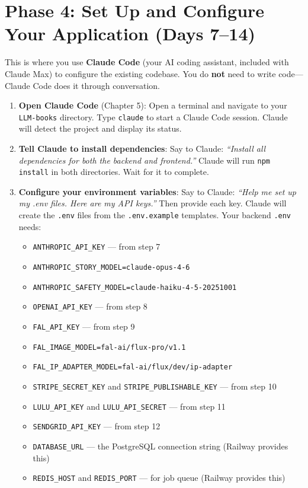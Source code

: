 \documentclass[12pt, letterpaper, oneside]{book}
\begin{document}
\section{Phase 4: Set Up and Configure Your Application (Days 7--14)}

This is where you use \textbf{Claude Code} (your AI coding assistant, included with Claude Max) to configure the existing codebase. You do \textbf{not} need to write code---Claude Code does it through conversation.

\begin{enumerate}[leftmargin=2em, itemsep=6pt, start=14]
  \item \textbf{Open Claude Code} (Chapter 5): Open a terminal and navigate to your \texttt{LLM-books} directory. Type \texttt{claude} to start a Claude Code session. Claude will detect the project and display its status.

  \item \textbf{Tell Claude to install dependencies}: Say to Claude: \textit{``Install all dependencies for both the backend and frontend.''} Claude will run \texttt{npm install} in both directories. Wait for it to complete.

  \item \textbf{Configure your environment variables}: Say to Claude: \textit{``Help me set up my .env files. Here are my API keys.''} Then provide each key. Claude will create the \texttt{.env} files from the \texttt{.env.example} templates. Your backend \texttt{.env} needs:
  \begin{itemize}[leftmargin=2em]
    \item \texttt{ANTHROPIC\_API\_KEY} --- from step 7
    \item \texttt{ANTHROPIC\_STORY\_MODEL=claude-opus-4-6}
    \item \texttt{ANTHROPIC\_SAFETY\_MODEL=claude-haiku-4-5-20251001}
    \item \texttt{OPENAI\_API\_KEY} --- from step 8
    \item \texttt{FAL\_API\_KEY} --- from step 9
    \item \texttt{FAL\_IMAGE\_MODEL=fal-ai/flux-pro/v1.1}
    \item \texttt{FAL\_IP\_ADAPTER\_MODEL=fal-ai/flux/dev/ip-adapter}
    \item \texttt{STRIPE\_SECRET\_KEY} and \texttt{STRIPE\_PUBLISHABLE\_KEY} --- from step 10
    \item \texttt{LULU\_API\_KEY} and \texttt{LULU\_API\_SECRET} --- from step 11
    \item \texttt{SENDGRID\_API\_KEY} --- from step 12
    \item \texttt{DATABASE\_URL} --- the PostgreSQL connection string (Railway provides this)
    \item \texttt{REDIS\_HOST} and \texttt{REDIS\_PORT} --- for job queue (Railway provides this)
  \end{itemize}


\end{enumerate}
\end{document}
